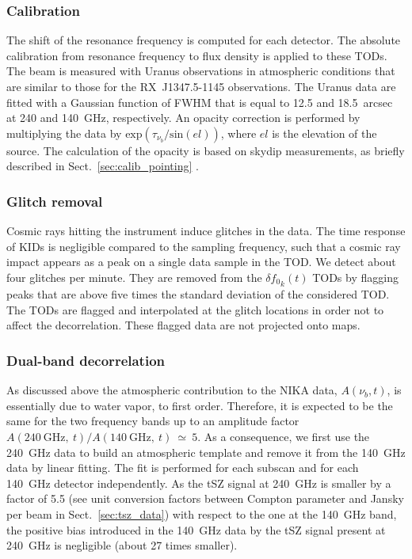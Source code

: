 \subsubsection{Calibration}
The shift of the resonance frequency is computed for each detector. The absolute calibration from resonance frequency to flux density is applied to these TODs. The beam is measured with Uranus observations in atmospheric conditions that are similar to those for the \mbox{RX~J1347.5-1145} observations. The Uranus data are fitted with a Gaussian function of FWHM that is equal to 12.5 and 18.5~arcsec at 240 and 140~GHz, respectively. An opacity correction is performed by multiplying the data by $\mathrm{exp}\left( \tau_{\nu_b} / \mathrm{sin}(el) \right)$, where $el$ is the elevation of the source. The calculation of the opacity is based on skydip measurements, as briefly described in Sect.~\ref{sec:calib_pointing} \cite[for more details, see][]{main_run5}.

\subsubsection{Glitch removal}
Cosmic rays hitting the instrument induce glitches in the data. The time response of KIDs is negligible compared to the sampling frequency, such that a cosmic ray impact appears as a peak on a single data sample in the TOD. We detect about four glitches per minute. They are removed from the ${\delta f_0}_k (t)$ TODs by flagging peaks that are above five times the standard deviation of the considered TOD. The TODs are flagged and interpolated at the glitch locations in order not to affect the decorrelation. These flagged data are not projected onto maps. 

\subsubsection{Dual-band decorrelation}
\label{sec:2band_decor}
As discussed above the atmospheric contribution to the NIKA data, $A(\nu_b, t)$, is essentially due to water vapor, to first order. Therefore, it is expected to be the same for the two frequency bands up to an amplitude factor $A(240~\mathrm{GHz},~t)/A(140~\mathrm{GHz},~t)~\simeq~5$. As a consequence, we first use the 240~GHz data to build an atmospheric template and remove it from the 140~GHz data by linear fitting. The fit is performed  for each subscan and for each 140~GHz detector independently. As the tSZ signal at 240~GHz is smaller by a factor of 5.5 (see  unit conversion factors between Compton parameter and Jansky per beam  in Sect.~\ref{sec:tsz_data}) with respect to the one at the 140~GHz band, the positive bias introduced in the 140~GHz data by the tSZ signal present at 240~GHz is negligible (about 27 times smaller). 

